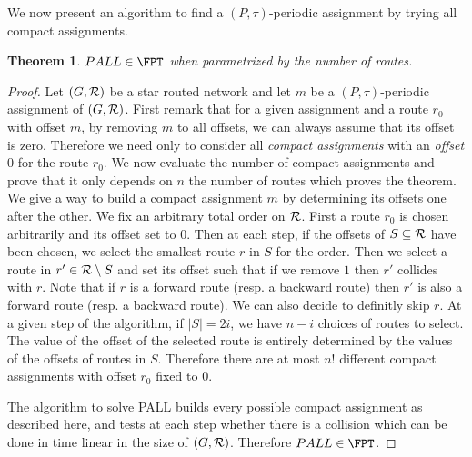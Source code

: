 \documentclass[10pt, conference, letterpaper]{IEEEtran}
\newtheorem{theorem}{Theorem}
\begin{document}
We now present an algorithm to find a $(P,\tau)$-periodic assignment 
by trying all compact assignments.

\begin{theorem}\label{th:FPT}
$PALL \in \FPT$ when parametrized by the number of routes.
\end{theorem}
\begin{proof}
Let $(G, {\cal R})$ be a star routed network and let $m$ be a $(P,\tau)$-periodic assignment of $(G, {\cal R})$. First remark that for a given assignment and a route $r_0$ with offset $m$, by removing $m$ to all offsets, we can always assume that its offset is zero. Therefore we need only to consider all \emph{compact assignments} with an \emph{offset $0$} for the route $r_0$. 
We now evaluate the number of compact assignments and prove that it only depends
on $n$ the number of routes which proves the theorem. 
We give a way to build a compact assignment $m$ by determining its offsets one after the other. We fix an arbitrary total order on ${\cal R}$.
First a route $r_0$ is chosen arbitrarily and its offset set to $0$. 
Then at each step, if the offsets of $S \subseteq  {\cal R}$ have been chosen,
we select the smallest route $r$ in $S$ for the order. 
Then we select a route in $r' \in {\cal R} \setminus S$ and set its offset such that 
if we remove $1$ then $r'$ collides with $r$. Note that if $r$ is a forward route (resp. a backward route) then $r'$ is also a forward route (resp. a backward route). We can also decide to definitly skip $r$. At a given step of the algorithm, if $|S| = 2i$, we have $n-i$ choices 
of routes to select. The value of the offset of the selected route is entirely determined by the values of the offsets of routes in $S$. Therefore there are at most $n!$ different compact assignments with offset $r_0$ fixed to $0$. 

The algorithm to solve PALL builds every possible compact assignment as described here, and
tests at each step whether there is a collision which can be done in time linear in the size of 
$(G, {\cal R})$. Therefore $PALL \in \FPT$.
\end{proof}
\end{document}

